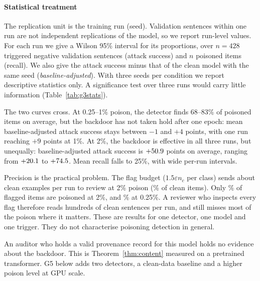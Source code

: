 \paragraph{Statistical treatment}
The replication unit is the training run (seed). Validation sentences within one run are not
independent replications of the model, so we report run-level values. For each run we give a
Wilson 95\% interval for its proportions, over $n=428$ triggered negative validation sentences
(attack success) and $n$ poisoned items (recall). We also give the attack success minus that of
the clean model with the same seed (\emph{baseline-adjusted}). With three seeds per condition
we report descriptive statistics only. A significance test over three runs would carry little
information (Table~\ref{tab:g3stats}).

The two curves cross. At 0.25--1\% poison, the detector finds 68--83\% of poisoned items on
average, but the backdoor has not taken hold after one epoch: mean baseline-adjusted attack
success stays between $-1$ and $+4$ points, with one run reaching $+9$ points at 1\%. At 2\%, the backdoor is effective in all three
runs, but unequally: baseline-adjusted attack success is $+50.9$ points on average,
ranging from $+20.1$ to $+74.5$. Mean recall falls to 25\%, with
wide per-run intervals.

Precision is the practical problem. The flag budget ($1.5\varepsilon n_c$ per class) sends
about \GthreeFPHigh{} clean examples per run to review at 2\% poison
(\GthreeFPRHigh\% of clean items). Only \GthreePrecHigh\% of flagged items are poisoned at 2\%,
and \GthreePrecLow\% at 0.25\%. A reviewer who inspects every flag therefore reads hundreds of
clean sentences per run, and still misses most of the poison where it matters. These are
results for one detector, one model and one trigger. They do not characterise poisoning
detection in general.

An auditor who holds a valid provenance record for this model holds no evidence about the
backdoor. This is Theorem~\ref{thm:content} measured on a pretrained transformer.
G5 below adds two detectors, a clean-data baseline and a higher poison level at GPU scale.

\begin{table}[t]
\centering\scriptsize
\caption{G3 summary: authorised-source backdoor poison, DistilBERT on SST-2 (3 seeds; mean
and range). Attack success over $n=428$ triggered negative sentences per run; clean accuracy
over $n=872$.}\label{tab:g3}
\end{table}

